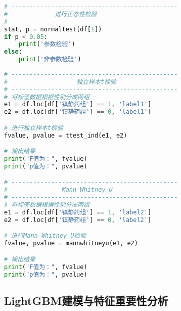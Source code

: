 \begin{lstlisting}[language=Python]
# ----------------------------------------------
#             进行正态性检验
# ----------------------------------------------
stat, p = normaltest(df[1])
if p < 0.05:
    print('参数检验')
else:
    print('非参数检验')
    
# ----------------------------------------------
#                   独立样本t检验
# ----------------------------------------------
# 将标签数据根据性别分成两组
e1 = df.loc[df['镇静药组'] == 1, 'label1']
e2 = df.loc[df['镇静药组'] == 0, 'label1']

# 进行独立样本t检验
fvalue, pvalue = ttest_ind(e1, e2)

# 输出结果
print("F值为：", fvalue)
print("p值为：", pvalue)

# ----------------------------------------------
#               Mann-Whitney U
# ----------------------------------------------
# 将标签数据根据性别分成两组
e1 = df.loc[df['镇静药组'] == 1, 'label2']
e2 = df.loc[df['镇静药组'] == 0, 'label2']

# 进行Mann-Whitney U检验
fvalue, pvalue = mannwhitneyu(e1, e2)

# 输出结果
print("F值为：", fvalue)
print("p值为：", pvalue)

\end{lstlisting}

\subsection{LightGBM建模与特征重要性分析}

